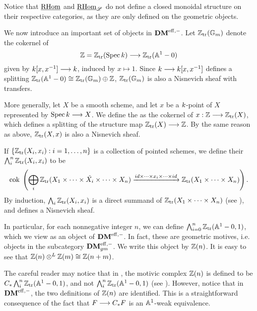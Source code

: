 \begin{rmk}\label{rmk_partial_ihom}
Notice that $\underline{\mathrm{RHom}}$ and $\underline{\mathrm{RHom}}_{\mathscr{L}}$ do not define a closed
monoidal structure on their respective categories, as they are only
defined on the geometric objects.
\end{rmk}

We now introduce an important set of objects in $\mathbf{DM}^{\mathrm{eff},-}$. Let 
$\mathbb{Z}_{\mathrm{tr}}(\mathbb{G}_m)$ denote the cokernel of
\[
   \mathbb{Z} = \mathbb{Z}_{\mathrm{tr}}(\mathrm{Spec}\, k) \longrightarrow \mathbb{Z}_{\mathrm{tr}}(\mathbb{A}^1 - 0)
\]
given by $k [x, x^{-1}] \longrightarrow k$, induced by
$x \mapsto 1$. Since $k \longrightarrow k[x, x^{-1}]$
defines a splitting $\mathbb{Z}_{\mathrm{tr}}(\mathbb{A}^1 - 0) \cong \mathbb{Z}_{\mathrm{tr}}(\mathbb{G}_m) \oplus \mathbb{Z}$,
$\mathbb{Z}_{\mathrm{tr}}(\mathbb{G}_m)$ is also a Nisnevich sheaf with transfers. 

More generally, let $X$ be a smooth scheme, and let $x$ be a 
$k$-point of $X$ represented by $\mathrm{Spec}\, k \longrightarrow X$. We 
define the  as the 
cokernel of $x: \mathbb{Z} \longrightarrow \mathbb{Z}_{\mathrm{tr}}(X)$, which defines a splitting of the 
structure map $\mathbb{Z}_{\mathrm{tr}}(X) \longrightarrow \mathbb{Z}$. By the same reason as above, 
$\mathbb{Z}_{\mathrm{tr}}(X, x)$ is also a Nisnevich sheaf.

If $\{\mathbb{Z}_{\mathrm{tr}}(X_i, x_i) : i = 1,\dots, n\}$ is a collection of 
pointed schemes, we define their  $\bigwedge_i^n
\mathbb{Z}_{\mathrm{tr}}(X_i, x_i)$ to be
\[
\mathrm{cok}\; \left( \bigoplus_i \mathbb{Z}_{\mathrm{tr}}(X_1 \times \cdots \times \hat{X_i} 
   \times \cdots \times X_n) \xrightarrow{id \times \cdots \times 
      x_i \times \cdots \times id} \mathbb{Z}_{\mathrm{tr}}(X_1 \times \cdots \times 
         X_n)\right).
\]
By induction, $\bigwedge_i \mathbb{Z}_{\mathrm{tr}}(X_i, x_i)$ is a direct summand of
$\mathbb{Z}_{\mathrm{tr}}(X_1 \times \cdots \times X_n)$ (see \cite[2.13]{MVW}),
and defines a Nisnevich sheaf.

In particular, for each nonnegative integer $n$, we can define 
$\bigwedge_{i = 0}^n \mathbb{Z}_{\mathrm{tr}}(\mathbb{A}^1 - 0, 1)$, which we view as an 
object of $\mathbf{DM}^{\mathrm{eff},-}$. In fact, these are geometric motives, i.e.
objects in the subcategory $\mathbf{DM}^{\mathrm{eff},-}_{gm}$. We write this object by 
$\mathbb{Z}(n)$. It is easy to see that $\mathbb{Z}(n) \otimes^L \mathbb{Z}(m) \cong 
\mathbb{Z}(n + m)$. 

\begin{rmk}
The careful reader may notice that in \cite{MVW}, the motivic 
complex $\mathbb{Z}(n)$ is defined to be $C_{*} \bigwedge_i^n \mathbb{Z}_{\mathrm{tr}}(\mathbb{A}^1 
- 0, 1)$, and not $\bigwedge_i^n \mathbb{Z}_{\mathrm{tr}}(\mathbb{A}^1 - 0, 1)$ (see 
\cite[3.1]{MVW}). However, notice that in $\mathbf{DM}^{\mathrm{eff},-}$, the
two definitions of $\mathbb{Z}(n)$ are identified. This is a 
straightforward consequence of the fact that $F \longrightarrow C_{*} F$ is
an $\mathbb{A}^1$-weak equivalence.
\end{rmk}

